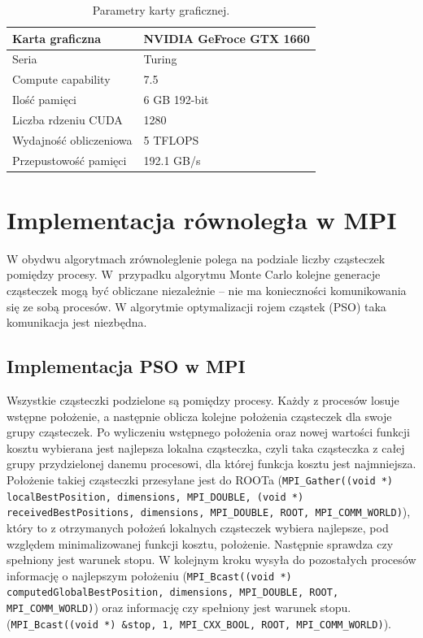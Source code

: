 \documentclass[11pt, a4paper, oneside]{article}
\begin{document}
\begin{table}[h]
\centering
\begin{tabular}{|l|l|}
\hline
Karta graficzna          & NVIDIA GeFroce GTX 1660 \\ \hline
Seria     & Turing                              \\ \hline
Compute capability    & 7.5                             \\ \hline
Ilość pamięci   & 6 GB 192-bit                                 \\ \hline
Liczba rdzeniu CUDA & 1280      \\ \hline
Wydajność obliczeniowa			  & 5 TFLOPS						        \\ \hline
Przepustowość pamięci			  & 192.1 GB/s						        \\ \hline
\end{tabular}
\caption{Parametry karty graficznej.}
\label{tab:par-gpu}
\end{table}


\section{Implementacja równoległa w MPI}

W obydwu algorytmach zrównoleglenie polega na podziale liczby cząsteczek pomiędzy procesy. W~przypadku algorytmu Monte Carlo kolejne generacje cząsteczek mogą być obliczane niezależnie -- nie ma konieczności komunikowania się ze sobą procesów. W algorytmie optymalizacji rojem cząstek (PSO) taka komunikacja jest niezbędna. 


\subsection{Implementacja PSO w MPI}

Wszystkie cząsteczki podzielone są pomiędzy procesy. Każdy z procesów losuje wstępne położenie, a następnie oblicza kolejne położenia cząsteczek dla swoje grupy cząsteczek. Po wyliczeniu wstępnego położenia oraz nowej wartości funkcji kosztu wybierana jest najlepsza lokalna cząsteczka, czyli taka cząsteczka z całej grupy przydzielonej danemu procesowi, dla której funkcja kosztu jest najmniejsza. Położenie takiej cząsteczki przesyłane jest do ROOTa (\lstinline[style=mycpp]{MPI_Gather((void *) localBestPosition, dimensions, MPI_DOUBLE, (void *) receivedBestPositions, dimensions, MPI_DOUBLE, ROOT, MPI_COMM_WORLD)}), który to z otrzymanych położeń lokalnych cząsteczek wybiera najlepsze, pod względem minimalizowanej funkcji kosztu, położenie. Następnie sprawdza czy spełniony jest warunek stopu. W kolejnym kroku wysyła do pozostałych procesów informację o najlepszym położeniu (\lstinline[style=mycpp]{MPI_Bcast((void *) computedGlobalBestPosition, dimensions, MPI_DOUBLE, ROOT, MPI_COMM_WORLD)}) oraz informację czy spełniony jest warunek stopu. (\lstinline[style=mycpp]{MPI_Bcast((void *) &stop, 1, MPI_CXX_BOOL, ROOT, MPI_COMM_WORLD)}).
\end{document}
